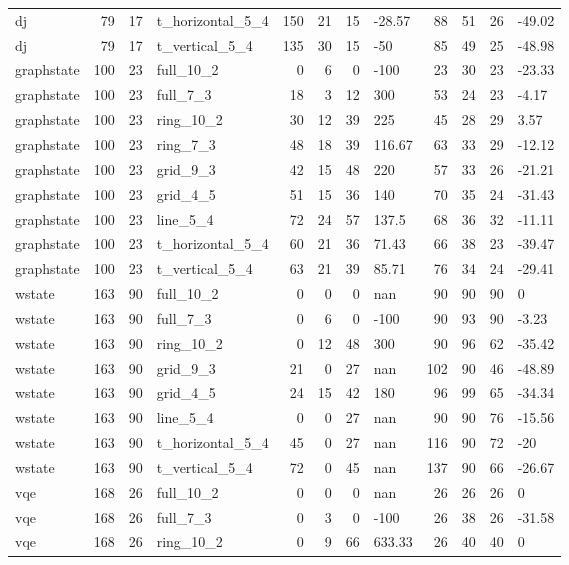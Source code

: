 \begin{longtable}{lrrlrrrlrrrl}
dj & 79 & 17 & t\_horizontal\_5\_4 & 150 & 21 & 15 & -28.57 & 88 & 51 & 26 & -49.02 \\
dj & 79 & 17 & t\_vertical\_5\_4 & 135 & 30 & 15 & -50 & 85 & 49 & 25 & -48.98 \\
graphstate & 100 & 23 & full\_10\_2 & 0 & 6 & 0 & -100 & 23 & 30 & 23 & -23.33 \\
graphstate & 100 & 23 & full\_7\_3 & 18 & 3 & 12 & 300 & 53 & 24 & 23 & -4.17 \\
graphstate & 100 & 23 & ring\_10\_2 & 30 & 12 & 39 & 225 & 45 & 28 & 29 & 3.57 \\
graphstate & 100 & 23 & ring\_7\_3 & 48 & 18 & 39 & 116.67 & 63 & 33 & 29 & -12.12 \\
graphstate & 100 & 23 & grid\_9\_3 & 42 & 15 & 48 & 220 & 57 & 33 & 26 & -21.21 \\
graphstate & 100 & 23 & grid\_4\_5 & 51 & 15 & 36 & 140 & 70 & 35 & 24 & -31.43 \\
graphstate & 100 & 23 & line\_5\_4 & 72 & 24 & 57 & 137.5 & 68 & 36 & 32 & -11.11 \\
graphstate & 100 & 23 & t\_horizontal\_5\_4 & 60 & 21 & 36 & 71.43 & 66 & 38 & 23 & -39.47 \\
graphstate & 100 & 23 & t\_vertical\_5\_4 & 63 & 21 & 39 & 85.71 & 76 & 34 & 24 & -29.41 \\
wstate & 163 & 90 & full\_10\_2 & 0 & 0 & 0 & nan & 90 & 90 & 90 & 0 \\
wstate & 163 & 90 & full\_7\_3 & 0 & 6 & 0 & -100 & 90 & 93 & 90 & -3.23 \\
wstate & 163 & 90 & ring\_10\_2 & 0 & 12 & 48 & 300 & 90 & 96 & 62 & -35.42 \\
wstate & 163 & 90 & grid\_9\_3 & 21 & 0 & 27 & nan & 102 & 90 & 46 & -48.89 \\
wstate & 163 & 90 & grid\_4\_5 & 24 & 15 & 42 & 180 & 96 & 99 & 65 & -34.34 \\
wstate & 163 & 90 & line\_5\_4 & 0 & 0 & 27 & nan & 90 & 90 & 76 & -15.56 \\
wstate & 163 & 90 & t\_horizontal\_5\_4 & 45 & 0 & 27 & nan & 116 & 90 & 72 & -20 \\
wstate & 163 & 90 & t\_vertical\_5\_4 & 72 & 0 & 45 & nan & 137 & 90 & 66 & -26.67 \\
vqe & 168 & 26 & full\_10\_2 & 0 & 0 & 0 & nan & 26 & 26 & 26 & 0 \\
vqe & 168 & 26 & full\_7\_3 & 0 & 3 & 0 & -100 & 26 & 38 & 26 & -31.58 \\
vqe & 168 & 26 & ring\_10\_2 & 0 & 9 & 66 & 633.33 & 26 & 40 & 40 & 0 \\

\end{longtable}
